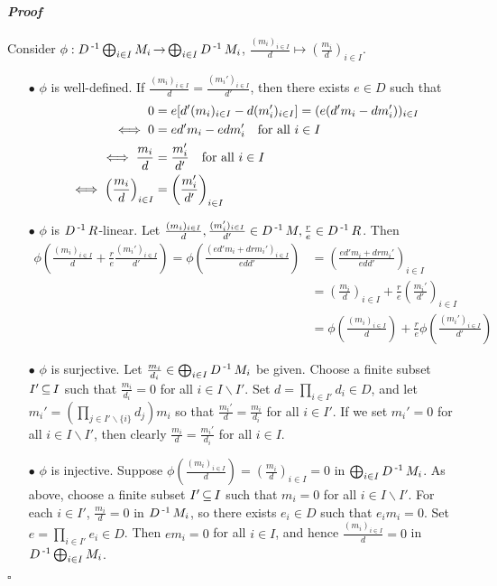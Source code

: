 \documentclass[11pt]{book}
\theoremstyle{definition}   \newtheorem{defn}[counter]{Definition} %
\newcommand{\bs}{\backslash}   \newcommand{\A}{\mathcal{A}}   \newcommand{\sy}{\textnormal{Syl}}   \newcommand{\size}[1]{\left| #1 \right|}
\DeclareMathOperator{\ra}{\rightarrow}   \DeclareMathOperator{\Poly}{\mathbf{P}}   \DeclareMathOperator{\spn}{\textnormal{span}}   \DeclareMathOperator{\aut}{\textnormal{Aut}}
\newenvironment{prf}{\paragraph{\textit{Proof}}}{\hfill$\square$}
\numberwithin{counter}{chapter}
\begin{document}
\begin{prf}
Consider $\phi : D\inv \bigoplus_{i\in I} M_i \ra \bigoplus_{i \in I} D\inv M_i$, $\frac{(m_i)_{i \in I}}{d} \mapsto \left(\frac{m_i}{d}\right)_{i \in I}$.
\begin{enumerate}
\item[$\bullet$] $\phi$ is well-defined. If $\frac{(m_i)_{i \in I}}{d} = \frac{(m_i')_{i \in I}}{d'}$, then there exists $e \in D$ such that
\begin{align*}
0 &= e[d'(m_i)_{i \in I} - d(m_i')_{i \in I}] = (e(d'm_i - dm_i'))_{i \in I} \\
\iff 0 &= ed'm_i - edm_i' \quad \textnormal{for all } i \in I \\
\iff \frac{m_i}{d} &= \frac{m_i'}{d'} \quad \textnormal{for all } i \in I \\
\iff \left(\frac{m_i}{d}\right)_{i \in I} &= \left(\frac{m_i'}{d'}\right)_{i \in I}
\end{align*}

\item[$\bullet$] $\phi$ is $D\operatorname{^{-1}} R$-linear. Let $\frac{(m_i)_{i \in I}}{d}, \frac{(m_i')_{i \in I}}{d'} \in D\operatorname{^{-1}} M, \frac{r}{e} \in D\operatorname{^{-1}} R$. Then
\begin{align*}
\phi \left(\frac{(m_i)_{i \in I}}{d} + \frac{r}{e} \frac{(m_i')_{i \in I}}{d'}\right) = \phi\left( \frac{(ed'm_i + drm_i')_{i \in I}}{edd'}\right) &= \left(\frac{ed'm_i + drm_i'}{edd'}\right)_{i \in I} \\
&= \left(\frac{m_i}{d}\right)_{i \in I} + \frac{r}{e} \left(\frac{m_i'}{d'}\right)_{i \in I} \\ &= \phi \left(\frac{(m_i)_{i \in I}}{d}\right) + \frac{r}{e} \phi \left(\frac{(m_i')_{i \in I}}{d'}\right)
\end{align*}

\item[$\bullet$] $\phi$ is surjective. Let $\frac{m_i}{d_i} \in \bigoplus_{i \in I} D\operatorname{^{-1}} M_i$ be given. Choose a finite subset $I' \operatorname{\subseteq} I$ such that $\frac{m_i}{d_i} = 0$ for all $i \in I \bs I'$. Set $d = \prod_{i \in I'} d_i \in D$, and let $m_i' = (\prod_{j \in I'\bs\{i\}} d_j) m_i$ so that $\frac{m_i'}{d} = \frac{m_i}{d_i}$ for all $i \in I'$. If we set $m_i' = 0$ for all $i \in I \bs I'$, then clearly $\frac{m_i}{d} = \frac{m_i'}{d_i}$ for all $i \in I$.

\item[$\bullet$] $\phi$ is injective. Suppose $\phi \left( \frac{(m_i)_{i \in I}}{d} \right) = \left(\frac{m_i}{d}\right)_{i \in I} = 0$ in $\bigoplus_{i \in I} D\operatorname{^{-1}} M_i$. As above, choose a finite subset $I' \operatorname{\subseteq} I$ such that $m_i = 0$ for all $i \in I \bs I'$. For each $i \in I'$, $\frac{m_i}{d} = 0$ in $D\operatorname{^{-1}} M_i$, so there exists $e_i \in D$ such that $e_i m_i = 0$. Set $e = \prod_{i \in I'} e_i \in D$. Then $em_i = 0$ for all $i \in I$, and hence $\frac{(m_i)_{i \in I}}{d} = 0$ in $D\operatorname{^{-1}} \bigoplus_{i \in I} M_i$.
\end{enumerate}
\end{prf}
\end{document}
